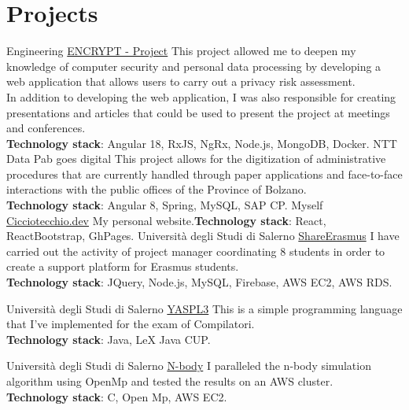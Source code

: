 \documentclass[%
               doublesided,
               paper=a4,
               fontsize=10pt
              ]{my-resume}
\begin{document}
{    \section[\faCode]{Projects}
        {Engineering}
        {\href{https://encrypt-project.eu/}{ENCRYPT - Project}}
        {This project allowed me to deepen my knowledge of computer security and personal data processing by developing a web application that allows users to carry out a privacy risk assessment.\\
        In addition to developing the web application, I was also responsible for creating presentations and articles that could be used to present the project at meetings and conferences.\\ \textbf{Technology stack}: Angular 18, RxJS, NgRx, Node.js, MongoDB, Docker.}
        {NTT Data}
        {Pab goes digital}
        {This project allows for the digitization of administrative procedures that are currently handled through paper applications and face-to-face interactions with the public offices of the Province of Bolzano.\\ \textbf{Technology stack}: Angular 8, Spring, MySQL, SAP CP.}
        {Myself}
        {\href{https://github.com/CiccioTecchio/CiccioTecchio.dev}{Cicciotecchio.dev}}
        {My personal website.\textbf{Technology stack}: React, ReactBootstrap, GhPages.}
        {Università degli Studi di Salerno}
        {\href{https://github.com/CiccioTecchio/SharErasmus}{ShareErasmus}}
        {I have carried out the activity of project manager coordinating 8 students in order to create a support platform for Erasmus students.\\\textbf{Technology stack}: JQuery, Node.js, MySQL, Firebase, AWS EC2, AWS RDS.}
        
        {Università degli Studi di Salerno}
        {\href{https://github.com/CiccioTecchio/YASPL3}{YASPL3}}
        {This is a simple programming language that I've implemented for the exam of Compilatori.\\ \textbf{Technology stack}: Java, LeX Java CUP.}
    
        {Università degli Studi di Salerno}
        {\href{https://github.com/CiccioTecchio/n-Body_MPI}{N-body}}
        {I paralleled the n-body simulation algorithm using OpenMp and tested the results on an AWS cluster.\\ \textbf{Technology stack}: C, Open Mp, AWS EC2.}
        
}
\end{document}
